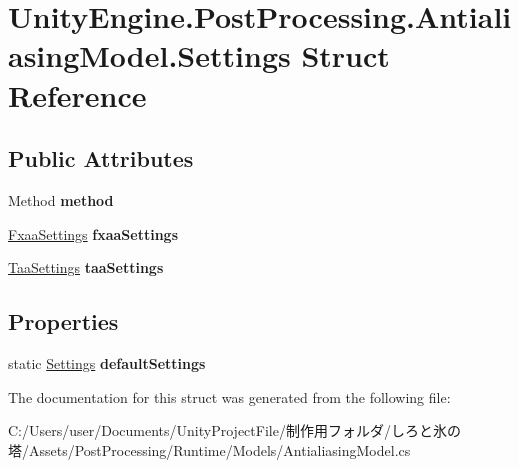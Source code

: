 \hypertarget{struct_unity_engine_1_1_post_processing_1_1_antialiasing_model_1_1_settings}{}\section{Unity\+Engine.\+Post\+Processing.\+Antialiasing\+Model.\+Settings Struct Reference}
\label{struct_unity_engine_1_1_post_processing_1_1_antialiasing_model_1_1_settings}
\subsection*{Public Attributes}
\begin{DoxyCompactItemize}
\item 
\mbox{\label{struct_unity_engine_1_1_post_processing_1_1_antialiasing_model_1_1_settings_a290930e87c63130ce62f3329d892ef30}} 
Method {\bfseries method}
\item 
\mbox{\label{struct_unity_engine_1_1_post_processing_1_1_antialiasing_model_1_1_settings_ae69900a58d52b60e6bd31feb3cccb3e5}} 
\hyperlink{struct_unity_engine_1_1_post_processing_1_1_antialiasing_model_1_1_fxaa_settings}{Fxaa\+Settings} {\bfseries fxaa\+Settings}
\item 
\mbox{\label{struct_unity_engine_1_1_post_processing_1_1_antialiasing_model_1_1_settings_aa4ac4787db6aca3c7a806212e9f88e68}} 
\hyperlink{struct_unity_engine_1_1_post_processing_1_1_antialiasing_model_1_1_taa_settings}{Taa\+Settings} {\bfseries taa\+Settings}
\end{DoxyCompactItemize}
\subsection*{Properties}
\begin{DoxyCompactItemize}
\item 
\mbox{\label{struct_unity_engine_1_1_post_processing_1_1_antialiasing_model_1_1_settings_a4a4c39cef618cb3485000208fe831295}} 
static \hyperlink{struct_unity_engine_1_1_post_processing_1_1_antialiasing_model_1_1_settings}{Settings} {\bfseries default\+Settings}
\end{DoxyCompactItemize}


The documentation for this struct was generated from the following file\+:\begin{DoxyCompactItemize}
\item 
C\+:/\+Users/user/\+Documents/\+Unity\+Project\+File/制作用フォルダ/しろと氷の塔/\+Assets/\+Post\+Processing/\+Runtime/\+Models/Antialiasing\+Model.\+cs\end{DoxyCompactItemize}

